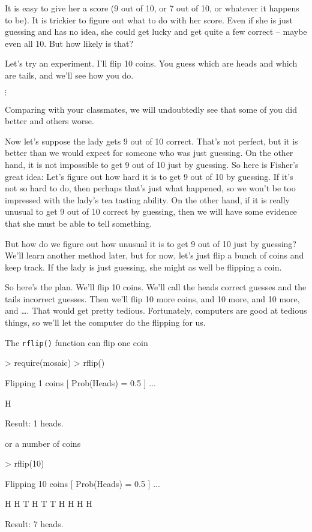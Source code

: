 It is easy to give her a score (9 out of 10, or 7 out of 10, or whatever
it happens to be).  It is trickier to figure out what to do with her score.
Even if she is just guessing and has no idea, she could get lucky and 
get quite a few correct -- maybe even all 10.  But how likely is that?

Let's try an experiment.  I'll flip 10 coins.  You guess which are heads and
which are tails, and we'll see how you do.  

$\vdots$

Comparing with your classmates, we will undoubtedly see that some 
of you did better and others worse.

Now let's suppose the lady gets 9 out of 10 correct.  That's not perfect,
but it is better than we would expect for someone who was just guessing.
On the other hand, it is not impossible to get 9 out of 10 just by guessing.
So here is Fisher's great idea:  Let's figure out how hard it is to get
9 out of 10 by guessing.  If it's not so hard to do, then perhaps that's 
just what happened, so we won't be too impressed with the lady's tea tasting
ability.  On the other hand, if it is really unusual to get 9 out of 10 
correct by guessing, then we will have some evidence that she must 
be able to tell something.

But how do we figure out how unusual it is to get 9 out of 10 just by 
guessing?  We'll learn another method later, but for now, let's just 
flip a bunch of coins and keep track.  If the lady is just guessing, she 
might as well be flipping a coin.

So here's the plan.  We'll flip 10 coins.  We'll call the heads correct 
guesses and the tails incorrect guesses.  Then we'll flip 10 more coins,
and 10 more, and 10 more, and \dots.  That would get pretty tedious.
Fortunately, computers are good at tedious things, so we'll let the computer 
do the flipping for us.

The \verb!rflip()! function can flip one coin

\begin{Schunk}
\begin{Sinput}
> require(mosaic)
> rflip()
\end{Sinput}
\begin{Soutput}
Flipping 1 coins [ Prob(Heads) = 0.5 ] ...

H

Result: 1 heads.
\end{Soutput}
\end{Schunk}
or a number of coins
\begin{Schunk}
\begin{Sinput}
> rflip(10)
\end{Sinput}
\begin{Soutput}
Flipping 10 coins [ Prob(Heads) = 0.5 ] ...

H H T H T T H H H H

Result: 7 heads.
\end{Soutput}
\end{Schunk}

